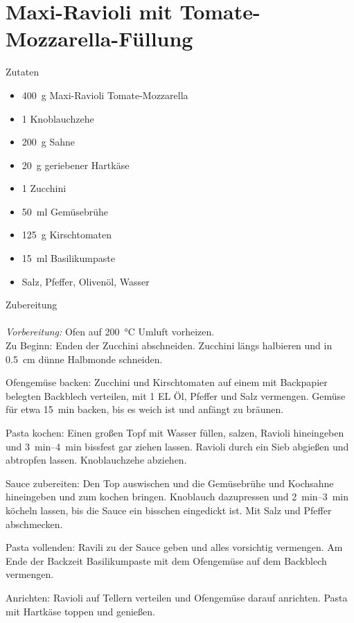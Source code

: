 \section*{Maxi-Ravioli mit Tomate-Mozzarella-Füllung}
\ihead{}\ohead{}
\cfoot{}
{\Large Zutaten}
\begin{multicols}{2}
\begin{itemize}
    \item \SI{400}{g} Maxi-Ravioli Tomate-Mozzarella
    \item \num{1} Knoblauchzehe
    \item \SI{200}{g} Sahne
    \item \SI{20}{g} geriebener Hartkäse
    \item \num{1} Zucchini
    \item \SI{50}{ml} Gemüsebrühe
    \item \SI{125}{g} Kirschtomaten
    \item \SI{15}{ml} Basilikumpaste
    \item Salz, Pfeffer, Olivenöl, Wasser
\end{itemize}
\end{multicols}
\noindent
{\Large Zubereitung}\\
\\
\textit{Vorbereitung:} Ofen auf \SI{200}{\celsius} Umluft vorheizen.\\
Zu Beginn: Enden der Zucchini abschneiden.
Zucchini längs halbieren und in \SI{0.5}{cm} dünne Halbmonde schneiden. 

Ofengemüse backen: Zucchini und Kirschtomaten auf einem mit Backpapier belegten Backblech verteilen, mit \num{1} EL Öl, Pfeffer und Salz vermengen. 
Gemüse für etwa \SI{15}{min} backen, bis es weich ist und anfängt zu bräunen. 

Pasta kochen: Einen großen Topf mit Wasser füllen, salzen, Ravioli hineingeben und \SIrange{3}{4}{min} bissfest gar ziehen lassen.
Ravioli durch ein Sieb abgießen und abtropfen lassen.
Knoblauchzehe abziehen.  

Sauce zubereiten: Den Top auswischen und die Gemüsebrühe und Kochsahne hineingeben und zum kochen bringen.
Knoblauch dazupressen und \SIrange{2}{3}{min} köcheln lassen, bis die Sauce ein bisschen eingedickt ist. 
Mit Salz und Pfeffer abschmecken. 

Pasta vollenden: Ravili zu der Sauce geben und alles vorsichtig vermengen. 
Am Ende der Backzeit Basilikumpaste mit dem Ofengemüse auf dem Backblech vermengen. 

Anrichten: Ravioli auf Tellern verteilen und Ofengemüse darauf anrichten. Pasta mit Hartkäse toppen und genießen.  